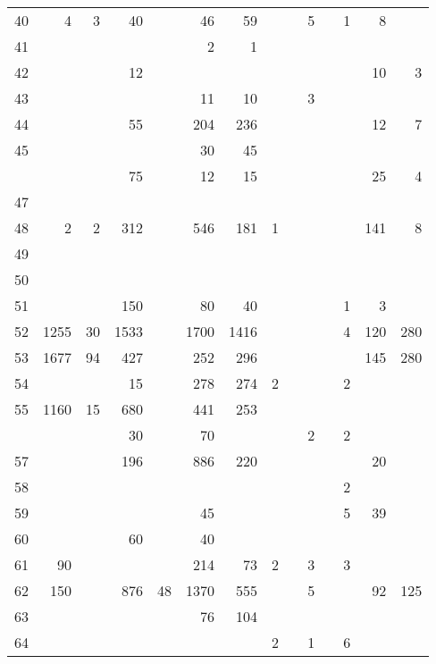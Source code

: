 \documentclass[
]{article}
\begin{document}
\begin{longtable}[l]{rrrrrrrrrrrrrr}
40 & 4 & 3 & 40 &  & 46 & 59 &  &  & 5 &  & 1 & 8 & \\
\addlinespace
\rowcolor{lightgray}  41 &  &  &  &  & 2 & 1 &  &  &  &  &  &  & \\
42 &  &  & 12 &  &  &  &  &  &  &  &  & 10 & 3\\
\rowcolor{lightgray}  43 &  &  &  &  & 11 & 10 &  &  & 3 &  &  &  & \\
44 &  &  & 55 &  & 204 & 236 &  &  &  &  &  & 12 & 7\\
\rowcolor{lightgray}  45 &  &  &  &  & 30 & 45 &  &  &  &  &  &  & \\
\addlinespace
46 &  &  & 75 &  & 12 & 15 &  &  &  &  &  & 25 & 4\\
\rowcolor{lightgray}  47 &  &  &  &  &  &  &  &  &  &  &  &  & \\
48 & 2 & 2 & 312 &  & 546 & 181 & 1 &  &  &  &  & 141 & 8\\
\rowcolor{lightgray}  49 &  &  &  &  &  &  &  &  &  &  &  &  & \\
50 &  &  &  &  &  &  &  &  &  &  &  &  & \\
\addlinespace
\rowcolor{lightgray}  51 &  &  & 150 &  & 80 & 40 &  &  &  &  & 1 & 3 & \\
52 & 1255 & 30 & 1533 &  & 1700 & 1416 &  &  &  &  & 4 & 120 & 280\\
\rowcolor{lightgray}  53 & 1677 & 94 & 427 &  & 252 & 296 &  &  &  &  &  & 145 & 280\\
54 &  &  & 15 &  & 278 & 274 & 2 &  &  &  & 2 &  & \\
\rowcolor{lightgray}  55 & 1160 & 15 & 680 &  & 441 & 253 &  &  &  &  &  &  & \\
\addlinespace
56 &  &  & 30 &  & 70 &  &  &  & 2 &  & 2 &  & \\
\rowcolor{lightgray}  57 &  &  & 196 &  & 886 & 220 &  &  &  &  &  & 20 & \\
58 &  &  &  &  &  &  &  &  &  &  & 2 &  & \\
\rowcolor{lightgray}  59 &  &  &  &  & 45 &  &  &  &  &  & 5 & 39 & \\
60 &  &  & 60 &  & 40 &  &  &  &  &  &  &  & \\
\addlinespace
\rowcolor{lightgray}  61 & 90 &  &  &  & 214 & 73 & 2 &  & 3 &  & 3 &  & \\
62 & 150 &  & 876 & 48 & 1370 & 555 &  &  & 5 &  &  & 92 & 125\\
\rowcolor{lightgray}  63 &  &  &  &  & 76 & 104 &  &  &  &  &  &  & \\
64 &  &  &  &  &  &  & 2 &  & 1 &  & 6 &  & \\

\end{longtable}
\end{document}
